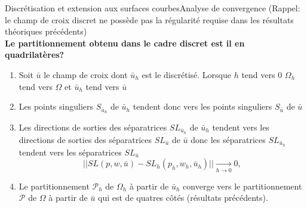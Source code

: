 \documentclass[compress,10pt,aspectratio=169]{beamer}
\begin{document}
\begin{frame}{Discrétisation et extension aux surfaces courbes}{Analyse de convergence}
\small
\vspace{-0.3cm}
(Rappel: le champ de croix discret ne possède pas la régularité requise dans les résultats théoriques précédents)\\\vspace{0.2cm}
{\bf Le partitionnement obtenu dans le cadre discret est il en quadrilatères?}\\\vspace{0.2cm}
\begin{enumerate}
    \item Soit $\bar{u}$ le champ de croix dont $\bar{u}_h$  est le discrétisé. Lorsque $h$ tend vers $0$
    $\Omega_h$ tend vers $\Omega$ et     $\bar{u}_h$ tend vers  $\bar{u}$
    \item Les points singuliers $S_{\bar{u}_h}$ de $\bar{u}_h$ tendent donc vers les points singuliers $S_{\bar{u}}$ de $\bar{u}$\\\vspace{0.2cm}
    \item Les directions de sorties des séparatrices $SL_{\bar{u}_h}$ de $\bar{u}_h$ tendent vers les directions de sorties des séparatrices $SL_{\bar{u}}$ de $\bar{u}$  donc les séparatrices $SL_{\bar{u}_h}$  tendent vers les séparatrices $SL_{\bar{u}}$\\\vspace{0.2cm}
    $$||SL(p,w,\bar{u})-SL_h(p_h,w_h,\bar{u}_h)||\xrightarrow[h \to 0]{} 0,$$
    \item Le partitionnement $\mathcal{P}_h$ de $\Omega_h$ à partir de $\bar{u}_h$ converge vers le partitionnement $\mathcal{P}$ de $\Omega$ à partir de $\bar{u}$ qui est de quatres côtés (résultats précédents).
\end{enumerate}
\end{frame}
\end{document}
